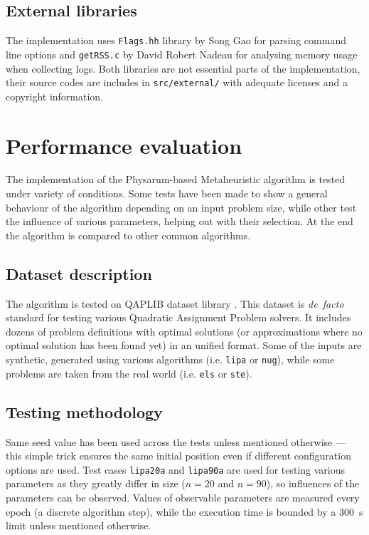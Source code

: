 \documentclass[english,a4paper,twoside]{ppfcmthesis}
\begin{document}
\subsection{External libraries}

The implementation uses \texttt{Flags.hh} library by Song Gao for parsing command line options and \texttt{getRSS.c} by David Robert Nadeau for analysing memory usage when collecting logs. Both libraries are not essential parts of the implementation, their source codes are includes in \texttt{src/external/} with adequate licenses and a copyright information. 


\section{Performance evaluation}
\label{section:project_evaluation}

The implementation of the Physarum-based Metaheuristic algorithm is tested under variety of conditions. Some tests have been made to show a general behaviour of the algorithm depending on an input problem size, while other test the influence of various parameters, helping out with their selection. At the end the algorithm is compared to other common algorithms.


\subsection{Dataset description}

The algorithm is tested on QAPLIB dataset library \cite{burkard1997qaplib}. This dataset is \textit{de~facto} standard for testing various Quadratic Assignment Problem solvers. It includes dozens of problem definitions with optimal solutions (or approximations where no optimal solution has been found yet) in an unified format. Some of the inputs are synthetic, generated using various algorithms (i.e. \texttt{lipa} or \texttt{nug}), while some problems are taken from the real world (i.e. \texttt{els} or \texttt{ste}).


\subsection{Testing methodology}

Same seed value has been used across the tests unless mentioned otherwise --- this simple trick ensures the same initial position even if different configuration options are used. Test cases \texttt{lipa20a} and \texttt{lipa90a} are used for testing various parameters as they greatly differ in size ($n=20$ and $n=90$), so influences of the parameters can be observed. Values of observable parameters are measured every epoch (a discrete algorithm step), while the execution time is bounded by a 300~s limit unless mentioned otherwise.
\end{document}
